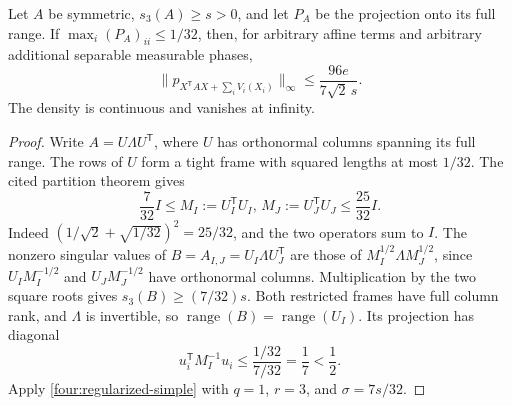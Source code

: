 \begin{corollary}\label{four:full-range}
Let \(A\) be symmetric, \(s_3(A)\geq s>0\), and let \(P_A\)
be the projection onto its full range.  If
\(\max_i(P_A)_{ii}\leq1/32\), then, for arbitrary affine terms
and arbitrary additional separable measurable phases,
\begin{equation}\label{four:full-range-bound}
 \|p_{X^{\mathsf T}AX+\sum_iV_i(X_i)}\|_\infty
 \leq\frac{96e}{7\sqrt2\,s}.
\end{equation}
The density is continuous and vanishes at infinity.
\end{corollary}
\begin{proof}
Write \(A=U\Lambda U^{\mathsf T}\), where \(U\) has orthonormal
columns spanning its full range.  The rows of \(U\) form a
tight frame with squared lengths at most \(1/32\).
The cited partition theorem gives
\[
 \frac7{32}I\leq M_I:=U_I^{\mathsf T}U_I,\,
                         M_J:=U_J^{\mathsf T}U_J
                 \leq\frac{25}{32}I.
\]
Indeed \((1/\sqrt2+\sqrt{1/32})^2=25/32\), and the
two operators sum to \(I\).
The nonzero singular values of
\(B=A_{I,J}=U_I\Lambda U_J^{\mathsf T}\) are those of
\(M_I^{1/2}\Lambda M_J^{1/2}\), since
\(U_IM_I^{-1/2}\) and \(U_JM_J^{-1/2}\) have orthonormal
columns.  Multiplication by the two square roots gives
\(s_3(B)\geq(7/32)s\).
Both restricted frames have full column rank, and \(\Lambda\)
is invertible, so \(\operatorname{range}(B)=\operatorname{range}(U_I)\).
Its projection has diagonal
\[
 u_i^{\mathsf T}M_I^{-1}u_i
 \leq\frac{1/32}{7/32}=\frac17<\frac12.
\]
Apply \eqref{four:regularized-simple} with \(q=1\), \(r=3\),
and \(\sigma=7s/32\).
\end{proof}

